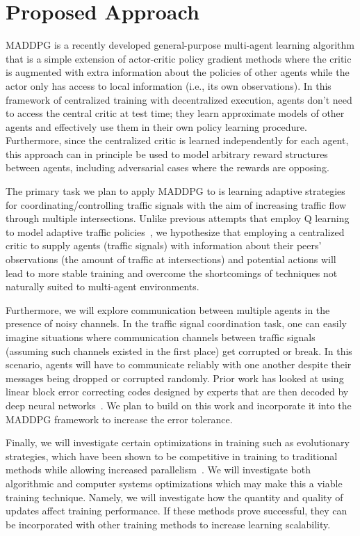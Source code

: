 
\section{Proposed Approach}
\label{sec:direction}

MADDPG is a recently developed general-purpose multi-agent learning algorithm
that is a simple extension of actor-critic policy gradient methods where the
critic is augmented with extra information about the policies of other agents
while the actor only has access to local information (i.e., its own
observations). In this framework of centralized training with decentralized
execution, agents don’t need to access the central critic at test time; they
learn approximate models of other agents and effectively use them in their own
policy learning procedure. Furthermore, since the centralized critic is
learned independently for each agent, this approach can in principle be used
to model arbitrary reward structures between agents, including adversarial
cases where the rewards are opposing.

The primary task we plan to apply MADDPG to is learning adaptive strategies
for coordinating/controlling traffic signals with the aim of increasing
traffic flow through multiple intersections. Unlike previous attempts that
employ Q learning to model adaptive traffic policies~\cite{araghi2015traffic},
we hypothesize that employing a centralized critic to supply agents (traffic
signals) with information about their peers’ observations (the amount of
traffic at intersections) and potential actions will lead to more stable
training and overcome the shortcomings of techniques not naturally suited to
multi-agent environments.

Furthermore, we will explore communication between multiple agents in the
presence of noisy channels. In the traffic signal coordination task, one can
easily imagine situations where communication channels between traffic signals
(assuming such channels existed in the first place) get corrupted or break. In
this scenario, agents will have to communicate reliably with one another
despite their messages being dropped or corrupted randomly. Prior work has
looked at using linear block error correcting codes designed by experts that
are then decoded by deep neural networks~\cite{nachmani2016learning,
nachmani2017rnn}. We plan to build on this work and incorporate it into the
MADDPG framework to increase the error tolerance.

Finally, we will investigate certain optimizations in training such as
evolutionary strategies, which have been shown to be competitive in training
to traditional methods while allowing increased
parallelism~\cite{salimans2017evolution}.
We will investigate both algorithmic and computer systems optimizations which may make this a viable training technique.
Namely, we will investigate how the quantity and quality of updates affect training performance.
If these methods prove successful, they can be incorporated with other training methods to increase learning scalability.



